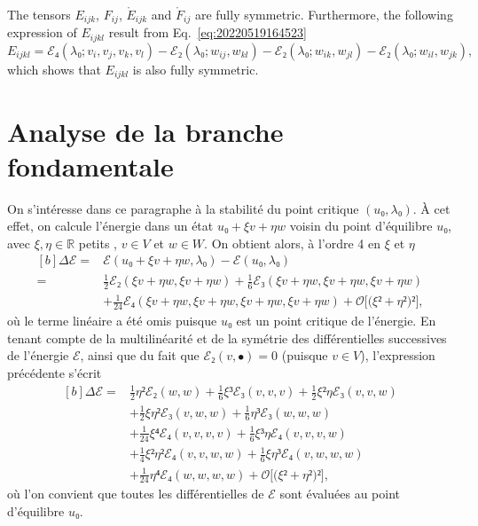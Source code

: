 \documentclass[12pt, final]{scrartcl}
\theoremstyle{definition}
\newcommand{\reals}{\mathbb{R}}
\begin{document}
The tensors \(E_{ijk}\), \(F_{ij}\), \(\mathring{E}_{ijk}\) and
\(\mathring{F}_{ij}\) are fully symmetric. Furthermore, the following expression
of \(E_{ijkl}\) result from Eq.~\eqref{eq:20220519164523}
\begin{equation}
  E_{ijkl} = ℰ₄(λ₀ ; v_i, v_j, v_k, v_l) - ℰ₂(λ₀ ; w_{ij}, w_{kl}) - ℰ₂(λ₀ ; w_{ik}, w_{jl}) - ℰ₂(λ₀ ; w_{il}, w_{jk}),
\end{equation}
which shows that \(E_{ijkl}\) is also fully symmetric.

\section{Analyse de la branche fondamentale}

On s'intéresse dans ce paragraphe à la stabilité du point critique \((u₀,
λ₀)\). À cet effet, on calcule l'énergie dans un état \(u₀ + ξ v + η w\) voisin
du point d'équilibre \(u₀\), avec \(ξ, η∈\reals\) {\guillemotleft} petits
{\guillemotright}, \(v \in V\) et \(w∈W\). On obtient alors, à l'ordre 4 en
\(ξ\) et \(η\)
\begin{equation}
  \begin{aligned}[b]
    Δℰ ={} &  ℰ(u₀ + ξv + ηw, λ₀) - ℰ(u₀, λ₀)\\
    ={} & \tfrac{1}{2} ℰ₂(ξv + ηw, ξv + ηw) + \tfrac{1}{6} ℰ₃(ξv + ηw, ξv + ηw, ξv + ηw)\\
    & + \tfrac{1}{24} ℰ₄(ξv + ηw, ξv + ηw, ξv + ηw, ξv + ηw) + \mathcal{O}\bigl[\bigl(ξ² + η²\bigr)²\bigr],
  \end{aligned}
\end{equation}
où le terme linéaire a été omis puisque \(u₀\) est un point critique de
l'énergie. En tenant compte de la multilinéarité et de la symétrie des
différentielles successives de l'énergie \(ℰ\), ainsi que du fait que
\(ℰ₂(v, •) = 0\) (puisque \(v∈V\)), l'expression précédente s'écrit
\begin{equation}
  \begin{aligned}[b]
    \Delta ℰ ={} & \tfrac{1}{2} η² ℰ₂(w, w) + \tfrac{1}{6} ξ³ ℰ₃(v, v, v) + \tfrac{1}{2} ξ² η ℰ₃(v, v, w)\\
    & + \tfrac{1}{2} ξ η² ℰ₃(v, w, w) + \tfrac{1}{6} η³ ℰ₃(w, w, w)\\
    & + \tfrac{1}{24} ξ⁴ ℰ₄(v, v, v, v) + \tfrac{1}{6} ξ³ η ℰ₄(v, v, v, w)\\
    & + \tfrac{1}{4} ξ² η² ℰ₄(v, v, w, w) + \tfrac{1}{6} ξ η³ ℰ₄(v, w, w, w)\\
    & + \tfrac{1}{24} η⁴ ℰ₄(w, w, w, w) +\mathcal{O}\bigl[\bigl(ξ² + η²\bigr)²\bigr],
  \end{aligned}
\end{equation}
où l'on convient que toutes les différentielles de \(ℰ\) sont évaluées au point
d'équilibre \(u₀\).
\end{document}
